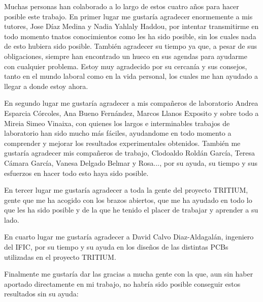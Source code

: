 Muchas personas han colaborado a lo largo de estos cuatro años para hacer posible este trabajo. En primer lugar me gustaría agradecer enormemente a mis tutores, Jose Díaz Medina y Nadia Yahlaly Haddou, por intentar transmitirme en todo momento tnatos conocimientos como les ha sido posible, sin los cuales nada de esto hubiera sido posible. También agradecer su tiempo ya que, a pesar de sus obligaciones, siempre han encontrado un hueco en sus agendas para ayudarme con cualquier problema. Estoy muy agradecido por su cercanía y sus consejos, tanto en el mundo laboral como en la vida personal, los cuales me han ayudado a llegar a donde estoy ahora.

En segundo lugar me gustaría agradecer a mis compañeros de laboratorio Andrea Esparcia Córcoles, Ana Bueno Fernández, Marcos Llanos Exposito y sobre todo a Mireia Simeo Vinaixa, con quienes los largos e interminables trabajos de laboratorio han sido mucho más fáciles, ayudandome en todo momento a comprender y mejorar los resultados experimentales obtenidos.  También me gustaría agradecer mis compañeros de trabajo, Clodoaldo Roldán García, Teresa Cámara García, Vanesa Delgado Belmar y Rosa..., por su ayuda, su tiempo y sus esfuerzos en hacer todo esto haya sido posible.

En tercer lugar me gustaría agradecer a toda la gente del proyecto TRITIUM, gente que me ha acogido con los brazos abiertos, que me ha ayudado en todo lo que les ha sido posible y de la que he tenido el placer de trabajar y aprender a su lado.

En cuarto lugar me gustaría agradecer a David Calvo Diaz-Aldagalán, ingeniero del IFIC, por su tiempo y su ayuda en los diseños de las distintas PCBs utilizadas en el proyecto TRITIUM.

Finalmente me gustaría dar las gracias a mucha gente con la que, aun sin haber aportado directamente en mi trabajo, no habría sido posible conseguir estos resultados sin su ayuda:

